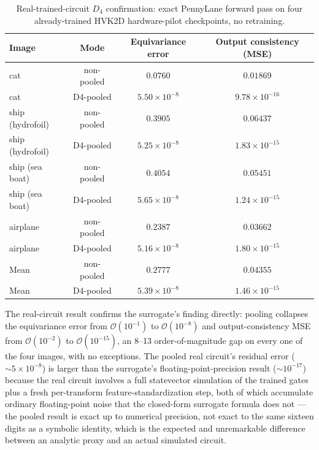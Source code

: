 \documentclass[11pt]{article}
\begin{document}
\begin{table}[H]
\centering
\caption{Real-trained-circuit $D_4$ confirmation: exact PennyLane forward pass on four already-trained HVK2D hardware-pilot checkpoints, no retraining.}
\label{tab:d4_real_circuit}
\scriptsize
\begin{tabular}{lccc}
\toprule
Image & Mode & Equivariance error & Output consistency (MSE) \\
\midrule
cat & non-pooled & $0.0760$ & $0.01869$ \\
cat & D4-pooled & $5.50\times10^{-8}$ & $9.78\times10^{-16}$ \\
ship (hydrofoil) & non-pooled & $0.3905$ & $0.06437$ \\
ship (hydrofoil) & D4-pooled & $5.25\times10^{-8}$ & $1.83\times10^{-15}$ \\
ship (sea boat) & non-pooled & $0.4054$ & $0.05451$ \\
ship (sea boat) & D4-pooled & $5.65\times10^{-8}$ & $1.24\times10^{-15}$ \\
airplane & non-pooled & $0.2387$ & $0.03662$ \\
airplane & D4-pooled & $5.16\times10^{-8}$ & $1.80\times10^{-15}$ \\
\midrule
Mean & non-pooled & $0.2777$ & $0.04355$ \\
Mean & D4-pooled & $5.39\times10^{-8}$ & $1.46\times10^{-15}$ \\
\bottomrule
\end{tabular}
\end{table}

The real-circuit result confirms the surrogate's finding directly: pooling collapses the equivariance error from $\mathcal{O}(10^{-1})$ to $\mathcal{O}(10^{-8})$ and output-consistency MSE from $\mathcal{O}(10^{-2})$ to $\mathcal{O}(10^{-15})$, an 8--13 order-of-magnitude gap on every one of the four images, with no exceptions. The pooled real circuit's residual error ($\sim\!5\times10^{-8}$) is larger than the surrogate's floating-point-precision result ($\sim\!10^{-17}$) because the real circuit involves a full statevector simulation of the trained gates plus a fresh per-transform feature-standardization step, both of which accumulate ordinary floating-point noise that the closed-form surrogate formula does not --- the pooled result is exact up to numerical precision, not exact to the same sixteen digits as a symbolic identity, which is the expected and unremarkable difference between an analytic proxy and an actual simulated circuit.
\end{document}
